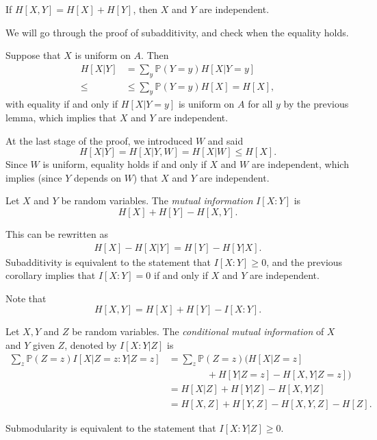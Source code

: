 \documentclass[12pt]{article}
\begin{document}
\begin{corollary}
	If $H[X,Y] = H[X] + H[Y]$, then $X$ and $Y$ are independent.
\end{corollary}

\begin{proofbox}
	We will go through the proof of subadditivity, and check when the equality holds.

	Suppose that $X$ is uniform on $A$. Then
	\begin{align*}
		H[X|Y] &= \sum_y \mathbb{P}(Y = y) H[X|Y=y] \\ \leq
		       &\leq \sum_{y} \mathbb{P}(Y = y) H[X] = H[X],
	\end{align*}
	with equality if and only if $H[X|Y = y]$ is uniform on $A$ for all $y$ by the previous lemma, which implies that $X$ and $Y$ are independent.

	At the last stage of the proof, we introduced $W$ and said
	\[
		H[X|Y] = H[X|Y,W] = H[X|W] \leq H[X].
	\]
	Since $W$ is uniform, equality holds if and only if $X$ and $W$ are independent, which implies (since $Y$ depends on $W$) that $X$ and $Y$ are independent.
\end{proofbox}

\begin{definition}
	Let $X$ and $Y$ be random variables. The \emph{mutual information} $I[X:Y]$ is
	\[
		H[X] + H[Y] - H[X,Y].
	\]
\end{definition}

This can be rewritten as
\begin{align*}
	 H[X] - H[X|Y] = H[Y] - H[Y|X].
\end{align*}
Subadditivity is equivalent to the statement that $I[X:Y] \geq 0$, and the previous corollary implies that $I[X:Y] = 0$ if and only if $X$ and $Y$ are independent.

Note that
\[
	H[X,Y] = H[X] + H[Y] - I[X:Y].
\]
\begin{definition}
	Let $X, Y$ and $Z$ be random variables. The \emph{conditional mutual information} of $X$ and $Y$ given $Z$, denoted by $I[X:Y|Z]$ is
	\begin{align*}
		\sum_{z} \mathbb{P}(Z = z) I[X|Z=z:Y|Z=z] &= \sum_z \mathbb{P}(Z = z) (H[X|Z=z] \\[-2.5ex]
							  & \qquad \qquad+ H[Y|Z=z] - H[X,Y|Z = z]) \\
							  &= H[X|Z] + H[Y|Z] - H[X,Y|Z] \\
							  &= H[X,Z] + H[Y,Z] - H[X,Y,Z] - H[Z].
	\end{align*}
\end{definition}
Submodularity is equivalent to the statement that $I[X:Y|Z] \geq 0$.
\end{document}
